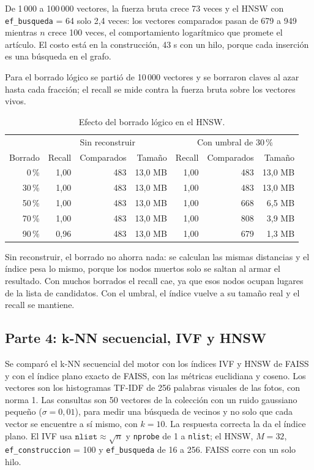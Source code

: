 \documentclass[11pt,a4paper]{article}
\begin{document}
De 1\,000 a 100\,000 vectores, la fuerza bruta crece 73 veces y el HNSW con \texttt{ef\_busqueda} = 64 solo 2,4 veces: los vectores comparados pasan de 679 a 949 mientras $n$ crece 100 veces, el comportamiento logarítmico que promete el artículo. El costo está en la construcción, 43 s con un hilo, porque cada inserción es una búsqueda en el grafo.

Para el borrado lógico se partió de 10\,000 vectores y se borraron claves al azar hasta cada fracción; el recall se mide contra la fuerza bruta sobre los vectores vivos.

\begin{table}[H]
\centering
\small
\begin{tabular}{rrrrrrr}
\toprule
 & \multicolumn{3}{c}{Sin reconstruir} & \multicolumn{3}{c}{Con umbral de 30\,\%} \\
Borrado & Recall & Comparados & Tamaño & Recall & Comparados & Tamaño \\
\midrule
0\,\% & 1,00 & 483 & 13,0 MB & 1,00 & 483 & 13,0 MB \\
30\,\% & 1,00 & 483 & 13,0 MB & 1,00 & 483 & 13,0 MB \\
50\,\% & 1,00 & 483 & 13,0 MB & 1,00 & 668 & 6,5 MB \\
70\,\% & 1,00 & 483 & 13,0 MB & 1,00 & 808 & 3,9 MB \\
90\,\% & 0,96 & 483 & 13,0 MB & 1,00 & 679 & 1,3 MB \\
\bottomrule
\end{tabular}
\caption{Efecto del borrado lógico en el HNSW.}
\end{table}

Sin reconstruir, el borrado no ahorra nada: se calculan las mismas distancias y el índice pesa lo mismo, porque los nodos muertos solo se saltan al armar el resultado. Con muchos borrados el recall cae, ya que esos nodos ocupan lugares de la lista de candidatos. Con el umbral, el índice vuelve a su tamaño real y el recall se mantiene.

\subsection{Parte 4: k-NN secuencial, IVF y HNSW}

Se comparó el k-NN secuencial del motor con los índices IVF y HNSW de FAISS y con el índice plano exacto de FAISS, con las métricas euclidiana y coseno. Los vectores son los histogramas TF-IDF de 256 palabras visuales de las fotos, con norma 1. Las consultas son 50 vectores de la colección con un ruido gaussiano pequeño ($\sigma = 0{,}01$), para medir una búsqueda de vecinos y no solo que cada vector se encuentre a sí mismo, con $k = 10$. La respuesta correcta la da el índice plano. El IVF usa $\texttt{nlist} \approx \sqrt{n}$ y \texttt{nprobe} de 1 a \texttt{nlist}; el HNSW, $M = 32$, \texttt{ef\_construccion} = 100 y \texttt{ef\_busqueda} de 16 a 256. FAISS corre con un solo hilo.
\end{document}
